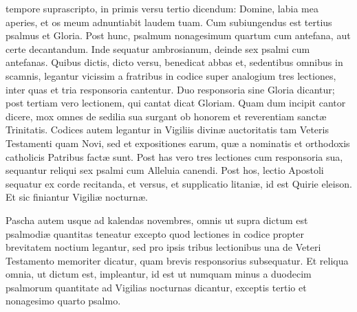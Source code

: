 \documentclass[fontsize=9pt,paper=A6,twoside,BCOR=1mm,DIV=22,headinclude]{scrarticle}
\begin{document}
\begin{multicols}{2}
{
 tempore suprascripto, in primis versu tertio dicendum: Domine, labia mea aperies, et os meum adnuntiabit laudem tuam. Cum subiungendus est tertius psalmus et Gloria. Post hunc, psalmum nonagesimum quartum cum antefana, aut certe decantandum. Inde sequatur ambrosianum, deinde sex psalmi cum antefanas. Quibus dictis, dicto versu, benedicat abbas et, sedentibus omnibus in scamnis, legantur vicissim a fratribus in codice super analogium tres lectiones, inter quas et tria responsoria cantentur. Duo responsoria sine Gloria dicantur; post tertiam vero lectionem, qui cantat dicat Gloriam. Quam dum incipit cantor dicere, mox omnes de sedilia sua surgant ob honorem et reverentiam sanctæ Trinitatis. Codices autem legantur in Vigiliis divinæ auctoritatis tam Veteris Testamenti quam Novi, sed et expositiones earum, quæ a nominatis et orthodoxis catholicis Patribus factæ sunt. Post has vero tres lectiones cum responsoria sua, sequantur reliqui sex psalmi cum Alleluia canendi. Post hos, lectio Apostoli sequatur ex corde recitanda, et versus, et supplicatio litaniæ, id est Quirie eleison. Et sic finiantur Vigiliæ nocturnæ. 

}

 Pascha autem usque ad kalendas novembres, omnis ut supra dictum est psalmodiæ quantitas teneatur excepto quod lectiones in codice propter brevitatem noctium legantur, sed pro ipsis tribus lectionibus una de Veteri Testamento memoriter dicatur, quam brevis responsorius subsequatur. Et reliqua omnia, ut dictum est, impleantur, id est ut numquam minus a duodecim psalmorum quantitate ad Vigilias nocturnas dicantur, exceptis tertio et nonagesimo quarto psalmo. 


\end{multicols}
\end{document}

